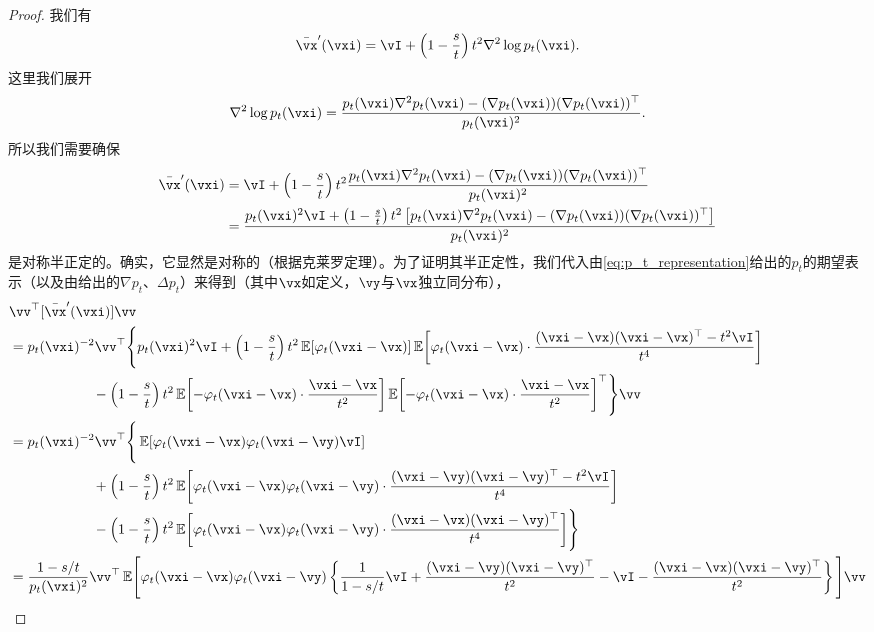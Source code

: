 \documentclass[../../book-main_zh.tex]{subfiles}
\begin{document}
\begin{proof}
    我们有
    \begin{equation}
        \bar{\vx}^{\prime}(\vxi) = \vI + \bp{1 - \frac{s}{t}}t^{2}\nabla^{2}\log p_{t}(\vxi).
    \end{equation}
    这里我们展开
    \begin{equation}
        \nabla^{2}\log p_{t}(\vxi) = \frac{p_{t}(\vxi)\nabla^{2}p_{t}(\vxi) - (\nabla p_{t}(\vxi))(\nabla p_{t}(\vxi))^{\top}}{p_{t}(\vxi)^{2}}.
    \end{equation}
    所以我们需要确保
    \begin{align}
        \bar{\vx}^{\prime}(\vxi)
        &= \vI + \bp{1 - \frac{s}{t}}t^{2}\frac{p_{t}(\vxi)\nabla^{2}p_{t}(\vxi) - (\nabla p_{t}(\vxi))(\nabla p_{t}(\vxi))^{\top}}{p_{t}(\vxi)^{2}} \\
        &= \frac{p_{t}(\vxi)^{2}\vI + \bp{1 - \frac{s}{t}}t^{2}\bs{p_{t}(\vxi)\nabla^{2}p_{t}(\vxi) - (\nabla p_{t}(\vxi))(\nabla p_{t}(\vxi))^{\top}}}{p_{t}(\vxi)^{2}}
    \end{align}
    是对称半正定的。确实，它显然是对称的（根据克莱罗定理）。为了证明其半正定性，我们代入由\eqref{eq:p_t_representation}给出的\(p_{t}\)的期望表示（以及由给出的\(\nabla p_{t}\)、\(\Delta p_{t}\)）来得到（其中\(\vx\)如定义，\(\vy\)与\(\vx\)独立同分布），
    \begin{align}
        &\vv^{\top}[\bar{\vx}^{\prime}(\vxi)]\vv \\
        &= p_{t}(\vxi)^{-2}\vv^{\top}\Bigg\{p_{t}(\vxi)^{2}\vI + \bp{1 - \frac{s}{t}}t^{2}\Ex[\phi_{t}(\vxi - \vx)]\Ex\rs{\phi_{t}(\vxi - \vx)\cdot\frac{(\vxi - \vx)(\vxi - \vx)^{\top} - t^{2}\vI}{t^{4}}} \\
        & \qquad \qquad \qquad -\bp{1 - \frac{s}{t}}t^{2}\Ex\rs{-\phi_{t}(\vxi - \vx)\cdot\frac{\vxi - \vx}{t^{2}}}\Ex\rs{-\phi_{t}(\vxi - \vx)\cdot\frac{\vxi - \vx}{t^{2}}}^{\top}\Bigg\}\vv \\
        &= p_{t}(\vxi)^{-2}\vv^{\top}\Bigg\{\Ex[\phi_{t}(\vxi - \vx)\phi_{t}(\vxi - \vy)\vI] \\
        & \qquad \qquad \qquad + \bp{1 - \frac{s}{t}}t^{2}\Ex\rs{\phi_{t}(\vxi - \vx)\phi_{t}(\vxi - \vy)\cdot\frac{(\vxi - \vy)(\vxi - \vy)^{\top} - t^{2}\vI}{t^{4}}} \\
        & \qquad \qquad \qquad -\bp{1 - \frac{s}{t}}t^{2}\Ex\rs{\phi_{t}(\vxi - \vx)\phi_{t}(\vxi - \vy)\cdot\frac{(\vxi - \vx)(\vxi - \vy)^{\top}}{t^{4}}}\Bigg\} \\ 
        &= \frac{1 - s/t}{p_{t}(\vxi)^{2}}\vv^{\top}\Ex\mathopen{}\Bigg[\phi_{t}(\vxi - \vx)\phi_{t}(\vxi - \vy)\bc{\frac{1}{1 - s/t}\vI + \frac{(\vxi - \vy)(\vxi - \vy)^{\top}}{t^{2}} - \vI - \frac{(\vxi - \vx)(\vxi - \vy)^{\top}}{t^{2}}}\Bigg]\vv \\

\end{align}
\end{proof}
\end{document}
